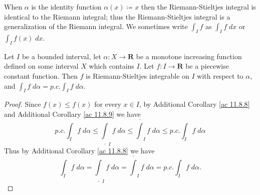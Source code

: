 \begin{note}
    When \(\alpha\) is the identity function \(\alpha(x) \coloneqq x\) then the Riemann-Stieltjes integral is identical to the Riemann integral;
    thus the Riemann-Stieltjes integral is a generalization of the Riemann integral.
    We sometimes write \(\int_I f\) as \(\int_I f \; dx\) or \(\int_I f(x) \; dx\).
\end{note}

\begin{additional corollary}\label{ac 11.8.10}
Let \(I\) be a bounded interval, let \(\alpha : X \to \mathbf{R}\) be a monotone increasing function defined on some interval \(X\) which contains \(I\).
Let \(f : I \to \mathbf{R}\) be a piecewise constant function.
Then \(f\) is Riemann-Stieltjes integrable on \(I\) with respect to \(\alpha\), and \(\int_I f \; d \alpha = p.c. \int_I f \; d \alpha\).
\end{additional corollary}

\begin{proof}
    Since \(f(x) \leq f(x)\) for every \(x \in I\), by Additional Corollary \ref{ac 11.8.8} and Additional Corollary \ref{ac 11.8.9} we have
    \[
        p.c. \int_I f \; d \alpha \leq \underline{\int}_I f \; d \alpha \leq \overline{\int}_I f \; d \alpha \leq p.c. \int_I f \; d \alpha
    \]
    Thus by Additional Corollary \ref{ac 11.8.8} we have
    \[
        \int_I f \; d \alpha = \underline{\int}_I f \; d \alpha = \overline{\int}_I f \; d \alpha = p.c. \int_I f \; d \alpha.
    \]
\end{proof}

